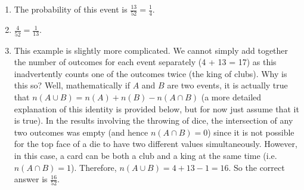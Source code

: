 {\begin{mdframed}[linewidth=4, leftmargin=40, rightmargin=40]
\begin{exercise}
\begin{enumerate}[noitemsep, label=\textbf{Step} \textbf{\arabic*}. ]
            \leftskip=20pt\rightskip=\leftskip\item  
        \label{m39377*id112177}The probability of this event is $\frac{13}{52}=\frac{1}{4}$.\par 
        \item  
        \label{m39377*id112208}$\frac{4}{52}=\frac{1}{13}$.\par 
        \item  
        \label{m39377*id112236}This example is slightly more complicated. We cannot
simply add together the number of outcomes for each event separately
(4 + 13 = 17) as this inadvertently counts one of the outcomes twice (the king
of clubs). Why is this so? Well, mathematically if $A$ and \begin{math}B\end{math} are two events, it is actually true that 
$n\left(A\cup B\right)=n\left(A\right)+n\left(B\right)-n\left(A\cap B\right)$ (a more detailed explanation of this identity is provided below, but for now just assume that it is true). In the results involving the
throwing of dice, the intersection of any two outcomes was empty (and hence
$n\left(A\cap B\right)=0$)
since it is not possible for the top face of a die to have two different values
simultaneously. However, in this case, a card can be both a club and a king at
the same time (i.e. $n\left(A\cap B\right)=1$).
Therefore, $n\left(A\cup B\right)=4+13-1=16$. So the correct answer is \begin{math}\frac{16}{52}\end{math}.
 \par 
        \end{enumerate}
    \end{exercise}
    \end{mdframed}
    }
    \noindent
\label{m39377*secfhsst!!!underscore!!!id343}
